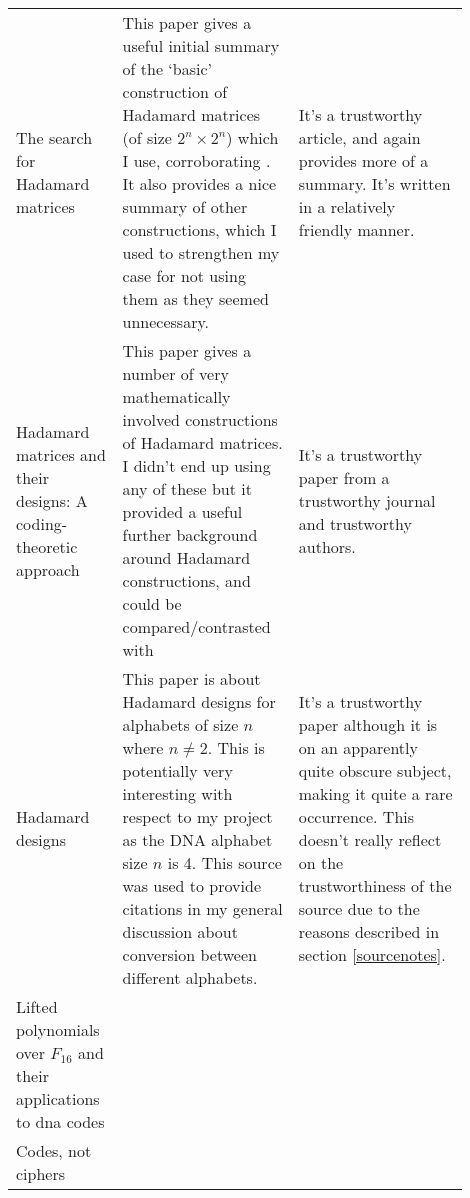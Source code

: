 \documentclass{article}
\begin{document}
\begin{center}
{\begin{longtable}{p{0.2\linewidth} p{0.35\linewidth} p{0.35\linewidth}}
    The search for Hadamard matrices \citep*{HadamardSearch1963GolombBaumert} &

    This paper gives a useful initial summary of the `basic' construction of
    Hadamard matrices (of size $2^n \times 2^n$)  which I use, corroborating
    \citep*{HadamardMatrices1978HedayatWallis}. It also provides a nice summary
    of other constructions, which I used to strengthen my case for not using
    them as they seemed unnecessary. &

    It's a trustworthy article, and again provides more of a summary. It's
    written in a relatively friendly manner. \\

    Hadamard matrices and their designs: A coding-theoretic approach \citep*{HadamardCodingTheoretic1992AssmusKey} & 

    This paper gives a number of very mathematically involved constructions of
    Hadamard matrices. I didn't end up using any of these but it provided a
    useful further background around Hadamard constructions, and could be
    compared/contrasted with \citep*{HadamardSearch1963GolombBaumert} & 
    
    It's a trustworthy paper from a trustworthy journal and trustworthy
    authors. \\

    Hadamard designs \citep*{HadamardDesigns1972Spence} & 

    This paper is about Hadamard designs for alphabets of size $n$ where $n
    \neq 2$. This is potentially very interesting with respect to my project as
    the DNA alphabet size $n$ is 4. This source was used to provide citations in my
    general discussion about conversion between different alphabets. &

    It's a trustworthy paper although it is on an apparently quite obscure
    subject, making it quite a rare occurrence. This doesn't really reflect on
    the trustworthiness of the source due to the reasons described in section
    \ref{sourcenotes}.  \\

    Lifted polynomials over ${F}_{16}$ and their applications to dna codes \citep*{PolynomialDNA2013OztasSiap} & 

    \\

    Codes, not ciphers \citep*{CodesCiphers1010Baylis} &

    \\


\end{longtable}}
\end{center}
\end{document}
